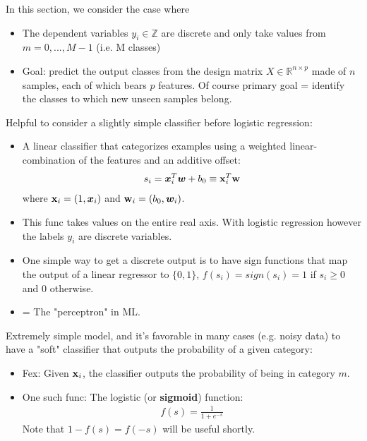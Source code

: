 \documentclass[norsk,a4paper,11pt]{article}
\begin{document}
In this section, we consider the case where
\begin{itemize}
	\item The dependent variables $y_i \in \mathbb{Z}$ are discrete and only take values from $m=0, ..., M-1$ (i.e. M classes)
	\item Goal: predict the output classes from the design matrix $X \in \mathbb{R}^{n\times p}$ made of $n$ samples, each of which bears $p$ features. Of course primary goal = identify the classes to which new unseen samples belong.
\end{itemize}
Helpful to consider a slightly simple classifier before logistic regression:
\begin{itemize}
	\item A linear classifier that categorizes examples using a weighted linear-combination of the features and an additive offset:
	\begin{align}
 		s_i = \bm{x}_i^T \bm{w} + b_0 \equiv \text{\textbf{x}}_i^T \text{\textbf{w}}
 	\end{align}
 	where $\text{\textbf{x}}_i = (1, \bm{x}_i)$ and $\text{\textbf{w}}_i = (b_0, \bm{w}_i)$.
 	\item This func takes values on the entire real axis. With logistic regression however the labels $y_i$ are discrete variables. 
 	\item One simple way to get a discrete output is to have sign functions that map the output of a linear regressor to $\{ 0, 1 \}$, $f(s_i) = sign(s_i) = 1$ if $s_i \geq 0$ and 0 otherwise. 
 	\item = The "perceptron" in ML.
 \end{itemize}
 Extremely simple model, and it's favorable in many cases (e.g. noisy data) to have a "soft" classifier that outputs the probability of a given category:
 \begin{itemize}
 	\item Fex: Given $\text{\textbf{x}}_i$, the classifier outputs the probability of being in category $m$.
 	\item One such func: The logistic (or \textbf{sigmoid}) function:
 	\begin{align}
 		f(s) = \frac{1}{1+e^{-s}}
 	\end{align}
 	Note that $1-f(s) = f(-s)$ will be useful shortly.
\end{itemize}
\end{document}
